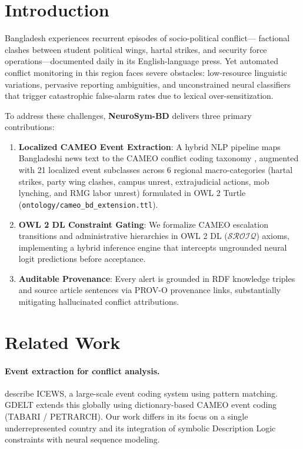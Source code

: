 \documentclass[11pt,a4paper]{article}
\begin{document}
\section{Introduction}
\label{sec:intro}

Bangladesh experiences recurrent episodes of socio-political conflict—
factional clashes between student political wings, hartal strikes, and security force operations—documented
daily in its English-language press.
Yet automated conflict monitoring in this region faces severe obstacles: low-resource linguistic variations,
pervasive reporting ambiguities, and unconstrained neural classifiers that trigger catastrophic false-alarm rates
due to lexical over-sensitization.

To address these challenges, \textbf{NeuroSym-BD} delivers three primary contributions:

\begin{enumerate}
  \item \textbf{Localized CAMEO Event Extraction}: A hybrid NLP pipeline maps Bangladeshi news text to the CAMEO
    conflict coding taxonomy \citep{gerner2002,schrodt2012}, augmented with 21 localized event subclasses across
    6 regional macro-categories (hartal strikes, party wing clashes, campus unrest, extrajudicial actions, mob lynching,
    and RMG labor unrest) formulated in OWL 2 Turtle (\texttt{ontology/cameo\_bd\_extension.ttl}).
  \item \textbf{OWL 2 DL Constraint Gating}: We formalize CAMEO escalation transitions and administrative
    hierarchies in OWL 2 DL ($\mathcal{SROIQ}$) axioms, implementing a hybrid inference engine that intercepts
    ungrounded neural logit predictions before acceptance.
  \item \textbf{Auditable Provenance}: Every alert is grounded in RDF knowledge triples and source article sentences
    via PROV-O provenance links, substantially mitigating hallucinated conflict attributions.
\end{enumerate}

\section{Related Work}
\label{sec:related}

\paragraph{Event extraction for conflict analysis.}
\citet{boschee2015icews} describe ICEWS, a large-scale event coding
system using pattern matching. GDELT \citep{leetaru2013} extends this
globally using dictionary-based CAMEO event coding (TABARI / PETRARCH). Our work differs in its
focus on a single underrepresented country and its integration of
symbolic Description Logic constraints with neural sequence modeling.
\end{document}
